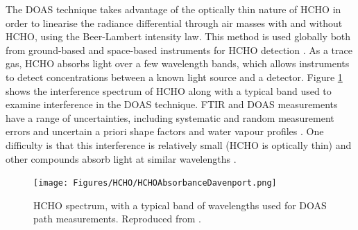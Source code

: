     The DOAS technique takes advantage of the optically thin nature of HCHO in order to linearise the radiance differential through air masses with and without HCHO, using the Beer-Lambert intensity law.
    This method is used globally both from ground-based and space-based instruments for HCHO detection \parencite{Guenther1995, Abad2015, Davenport2015}.
    As a trace gas, HCHO absorbs light over a few wavelength bands, which allows instruments to detect concentrations between a known light source and a detector.
    Figure \ref{LR:HCHO:Measurements:fig_HCHOSpectrum} shows the interference spectrum of HCHO along with a typical band used to examine interference in the DOAS technique.
    FTIR and DOAS measurements have a range of uncertainties, including 
    systematic and random measurement errors and uncertain a priori shape 
    factors and water vapour profiles \parencite[e.g.,][]{Franco2015}.
    One difficulty is that this interference is relatively small (HCHO is optically thin) and other compounds absorb light at similar wavelengths \parencite{Davenport2015}.
    
    \begin{figure}
      \texttt{[image: Figures/HCHO/HCHOAbsorbanceDavenport.png]}
      \caption{ %
        HCHO spectrum, with a typical band of wavelengths used for DOAS path measurements.
        Reproduced from \textcite{Davenport2015}.}
      \label{LR:HCHO:Measurements:fig_HCHOSpectrum}
    \end{figure}
    

